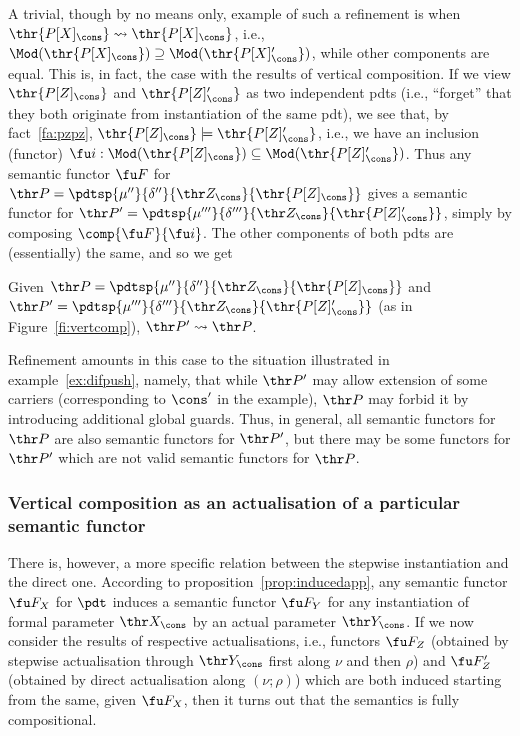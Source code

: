 A trivial, though by no means only, example of such a refinement is when
$\thr{P[X]_\cons}\leadsto\thr{P[X]_\cons}$, i.e.,
$\Mod(\thr{P[X]_\cons})\supseteq \Mod(\thr{P[X]'_\cons})$, while other
components are equal. This is, in fact, the case with the results of vertical
composition. If we view $\thr{P[Z]_\cons}$ and $\thr{P[Z]'_\cons}$ as two
independent pdts (i.e., ``forget'' that they both originate from instantiation
of the same pdt), we see that, 
by fact~\ref{fa:pzpz}, $\thr{P[Z]_\cons}\models
\thr{P[Z]'_\cons}$, i.e., we have an inclusion (functor)
$\fu i:\Mod(\thr{P[Z]_\cons})\subseteq\Mod(\thr{P[Z]'_\cons})$. 
Thus any semantic functor $\fu F$ for $\thr P= \pdtsp{\mu''}{\delta''}{\thr
Z_\cons}{\thr{P[Z]_\cons}}$ 
gives a semantic functor for $\thr P'= \pdtsp{\mu'''}{\delta'''}{\thr
Z_\cons}{\thr{P[Z]'_\cons}}$, simply 
by composing $\comp{\fu F}{\fu i}$.
The other components of both pdts are (essentially) the same, and so we get
%
\begin{fact}
Given $\thr P= \pdtsp{\mu''}{\delta''}{\thr
Z_\cons}{\thr{P[Z]_\cons}}$ and  $\thr P'= \pdtsp{\mu'''}{\delta'''}{\thr
Z_\cons}{\thr{P[Z]'_\cons}}$ (as in Figure~\ref{fi:vertcomp}), $\thr P'\leadsto \thr P$.
\end{fact}
%
Refinement amounts in this case to the situation illustrated in
example~\ref{ex:difpush}, namely, that while $\thr P'$ may allow extension of
some carriers (corresponding to $\cons'$ in the example), $\thr P$ may forbid
it by introducing additional global guards. Thus, in general, all semantic
functors for $\thr P$ are also semantic functors for $\thr P'$, but there may
be some functors for $\thr P'$ which are not valid semantic functors for
$\thr P$.

\subsubsection{Vertical composition as an actualisation of a particular semantic
functor}
There is, however, a more specific relation between the stepwise
instantiation and the direct one. According to
proposition~\ref{prop:inducedapp}, any semantic functor $\fu F_X$ for $\pdt$
induces a semantic functor $\fu F_Y$ for any instantiation of formal
parameter $\thr X_\cons$ by an actual parameter $\thr Y_\cons$. 
If we now consider the results of respective actualisations, i.e., functors
$\fu F_Z$ (obtained by stepwise actualisation through $\thr Y_\cons$ first
along $\nu$ and then $\rho$) and
$\fu F'_Z$ (obtained by direct actualisation along $(\nu;\rho)$) which are
both induced starting from the same, given $\fu F_X$, then it turns out that
the semantics is fully compositional. 

